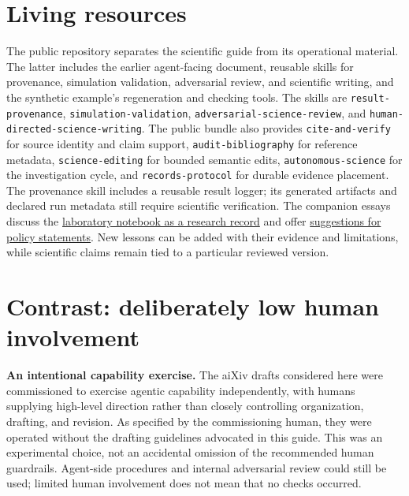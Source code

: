 \documentclass[aps,prd,reprint,nofootinbib]{revtex4-2}
\begin{document}
\section{Living resources}\label{app:resources}
The public repository separates the scientific guide from its operational material. The latter includes the earlier agent-facing document, reusable skills for provenance, simulation validation, adversarial review, and scientific writing, and the synthetic example's regeneration and checking tools. The skills are \texttt{result-provenance}, \texttt{simulation-validation}, \texttt{adversarial-science-review}, and \texttt{human-directed-science-writing}. The public bundle also provides \texttt{cite-and-verify} for source identity and claim support, \texttt{audit-bibliography} for reference metadata, \texttt{science-editing} for bounded semantic edits, \texttt{autonomous-science} for the investigation cycle, and \texttt{records-protocol} for durable evidence placement. The provenance skill includes a reusable result logger; its generated artifacts and declared run metadata still require scientific verification. The companion essays discuss the \href{https://github.com/oshaughnessy-junior/whitepaper-transparent-agentic-science/blob/main/docs/blog-ai-research-record.md}{laboratory notebook as a research record} and offer \href{https://github.com/oshaughnessy-junior/whitepaper-transparent-agentic-science/blob/main/docs/suggestions-for-policy-statements.md}{suggestions for policy statements}. New lessons can be added with their evidence and limitations, while scientific claims remain tied to a particular reviewed version.

\section{Contrast: deliberately low human involvement}\label{app:aixiv}
\textbf{An intentional capability exercise.} The aiXiv drafts considered here were commissioned to exercise agentic capability independently, with humans supplying high-level direction rather than closely controlling organization, drafting, and revision. As specified by the commissioning human, they were operated without the drafting guidelines advocated in this guide. This was an experimental choice, not an accidental omission of the recommended human guardrails. Agent-side procedures and internal adversarial review could still be used; limited human involvement does not mean that no checks occurred.
\end{document}
